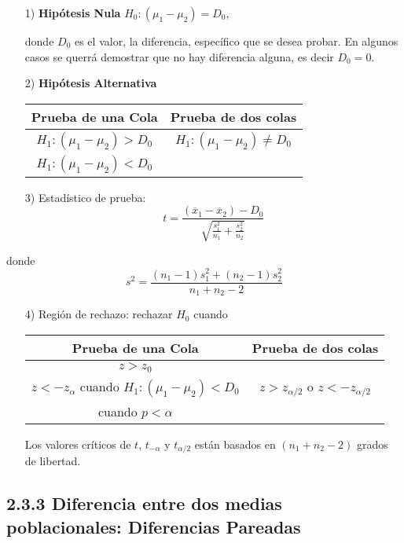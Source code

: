 \begin{frame}
\begin{frame}
\begin{Note}
\end{Note}

\begin{itemize}
\item[1) ] \textbf{Hip\'otesis Nula} $H_{0}:\left(\mu_{1}-\mu_{2}\right)=D_{0}$,\medskip

donde $D_{0}$ es el valor, la diferencia, espec\'ifico que se desea probar. En algunos casos se querr\'a demostrar que no hay diferencia alguna, es decir $D_{0}=0$.

\item[2) ] \textbf{Hip\'otesis Alternativa}
\begin{tabular}{cc}\hline
\textbf{Prueba de una Cola} & \textbf{Prueba de dos colas}\\\hline
$H_{1}:\left(\mu_{1}-\mu_{2}\right)>D_{0}$ & $H_{1}:\left(\mu_{1}-\mu_{2}\right)\neq D_{0}$\\ 
$H_{1}:\left(\mu_{1}-\mu_{2}\right)<D_{0}$&\\
\end{tabular}

\item[3) ] Estad\'istico de prueba:
$$t=\frac{\left(\overline{x}_{1}-\overline{x}_{2}\right)-D_{0}}{\sqrt{\frac{s^{2}_{1}}{n_{1}}+\frac{s^{2}_{2}}{n_{2}}}}$$
\end{itemize}






donde $$s^{2}=\frac{\left(n_{1}-1\right)s_{1}^{2}+\left(n_{2}-1\right)s_{2}^{2}}{n_{1}+n_{2}-2}$$
\begin{itemize}

\item[4) ] Regi\'on de rechazo: rechazar $H_{0}$ cuando
\begin{tabular}{cc}\hline
\textbf{Prueba de una Cola} & \textbf{Prueba de dos colas}\\\hline
$z>z_{0}$ & \\
$z<-z_{\alpha}$ cuando $H_{1}:\left(\mu_{1}-\mu_{2}\right)<D_{0}$&$z>z_{\alpha/2}$ o $z<-z_{\alpha/2}$\\
 cuando $p<\alpha$&\\
\end{tabular}
Los valores cr\'iticos de $t$, $t_{-\alpha}$ y $t_{\alpha/2}$ est\'an basados en $\left(n_{1}+n_{2}-2\right)$ grados de libertad.


\end{itemize}




\subsection{2.3.3 Diferencia entre dos medias poblacionales: Diferencias Pareadas}







\end{frame}
\end{frame}
